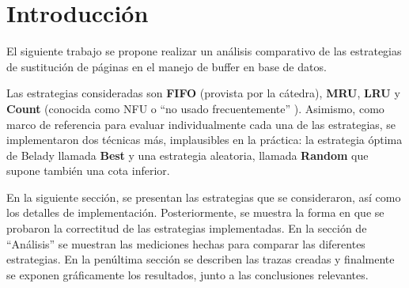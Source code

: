 \section{Introducci\'on}

El siguiente trabajo se propone realizar un an\'alisis comparativo de las estrategias de sustituci\'on de p\'aginas 
en el manejo de buffer en base de datos. 

Las estrategias consideradas son \textbf{FIFO} (provista por la c\'atedra), \textbf{MRU}, \textbf{LRU} y \textbf{Count} (conocida como NFU o ``no usado frecuentemente'' \cite{wiki1}). Asimismo, 
como marco de referencia para evaluar individualmente cada una de las estrategias, se implementaron dos t\'ecnicas m\'as, 
implausibles en la pr\'actica: la estrategia \'optima de Belady \cite{bel66} llamada \textbf{Best} y una 
estrategia aleatoria, llamada \textbf{Random} que supone tambi\'en una cota inferior.

En la siguiente secci\'on, se presentan las estrategias que se consideraron, as\'i como los detalles de implementaci\'on. 
Posteriormente, se muestra la forma en que se probaron la correctitud de las estrategias implementadas. 
En la secci\'on de ``An\'alisis'' se muestran las mediciones hechas para comparar las diferentes estrategias. 
En la pen\'ultima secci\'on se describen las trazas creadas y finalmente se exponen gr\'aficamente los resultados, 
junto a las conclusiones relevantes.
